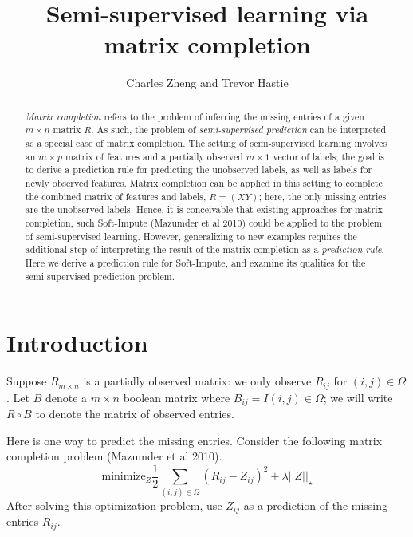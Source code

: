 \documentclass[11pt]{article}
\begin{document}
\newcommand{\tr}{\text{tr}}
\newcommand{\E}{\textbf{E}}
\newcommand{\diag}{\text{diag}}
\newcommand{\argmax}{\text{argmax}}
\newcommand{\argmin}{\text{argmin}}
\newcommand{\Cov}{\text{Cov}}
\newcommand{\Vol}{\text{Vol}}
\pagestyle{fancy}

\title{Semi-supervised learning via matrix completion}

\author{Charles Zheng and Trevor Hastie}

\maketitle

\begin{abstract}
\emph{Matrix completion} refers to the problem of inferring the
missing entries of a given $m\times n$ matrix $R$.  As such, the
problem of \emph{semi-supervised prediction} can be interpreted as a
special case of matrix completion.  The setting of semi-supervised
learning involves an $m \times p$ matrix of features and a partially
observed $m \times 1$ vector of labels; the goal is to derive a
prediction rule for predicting the unobserved labels, as well as
labels for newly observed features.  Matrix completion can be applied
in this setting to complete the combined matrix of features and
labels, $R = (X Y)$; here, the only missing entries are the unobserved
labels.  Hence, it is conceivable that existing approaches for matrix
completion, such Soft-Impute (Mazumder et al 2010) could be applied to
the problem of semi-supervised learning.  However, generalizing to new
examples requires the additional step of interpreting the result of
the matrix completion as a \emph{prediction rule}.  Here we derive a
prediction rule for Soft-Impute, and examine its qualities for the
semi-supervised prediction problem.
\end{abstract}

\section{Introduction}

Suppose $R_{m \times n}$ is a partially observed matrix: we only
observe $R_{ij}$ for $(i, j) \in \Omega$.  Let $B$ denote a $m \times
n$ boolean matrix where $B_{ij} = I{(i, j) \in \Omega}$; we will write
$R \circ B$ to denote the matrix of observed entries.

Here is one way to predict the missing entries.  Consider the
following matrix completion problem (Mazumder et al 2010).
$$
\text{minimize}_Z \frac{1}{2}\sum_{(i,j) \in \Omega} (R_{ij} - Z_{ij})^2 + \lambda ||Z||_\star 
$$ After solving this optimization problem, use $Z_{ij}$ as a
prediction of the missing entries $R_{ij}$.
\end{document}

